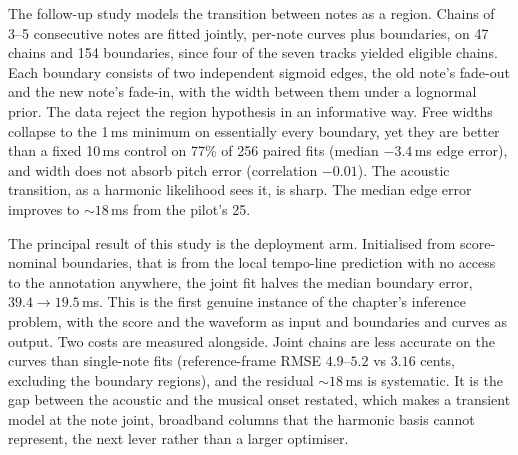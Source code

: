 The follow-up study models the transition between notes as a region.
Chains of 3--5 consecutive notes are fitted jointly, per-note curves plus
boundaries, on 47 chains and 154 boundaries, since four of the seven tracks
yielded eligible chains. Each boundary consists of two independent sigmoid
edges, the old note's fade-out and the new note's fade-in, with the width
between them under a lognormal prior. The data reject the region hypothesis
in an informative way. Free widths collapse to the 1\,ms minimum on
essentially every boundary, yet they are better than a fixed 10\,ms control
on 77\% of 256 paired fits (median $-3.4$\,ms edge error), and width does
not absorb pitch error (correlation $-0.01$). The acoustic transition, as a
harmonic likelihood sees it, is sharp. The median edge error improves to
${\sim}18$\,ms from the pilot's 25.

The principal result of this study is the deployment arm. Initialised from
score-nominal boundaries, that is from the local tempo-line prediction with
no access to the annotation anywhere, the joint fit halves the median
boundary error, $39.4 \to 19.5$\,ms. This is the first genuine instance of
the chapter's inference problem, with the score and the waveform as input
and boundaries and curves as output. Two costs are measured alongside.
Joint chains are less accurate on the curves than single-note fits
(reference-frame RMSE $4.9$--$5.2$ vs $3.16$ cents, excluding the boundary
regions), and the residual ${\sim}18$\,ms is systematic. It is the gap
between the acoustic and the musical onset restated, which makes a
transient model at the note joint, broadband columns that the harmonic
basis cannot represent, the next lever rather than a larger optimiser.



